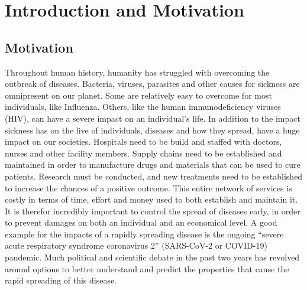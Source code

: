 
\chapter{Introduction and Motivation} %

\label{chap:introduction} %

\section{Motivation}
Throughout human history, humanity has struggled with overcoming the outbreak of diseases.
Bacteria, viruses, parasites and other causes for sickness are omnipresent on our planet\cite{balloux2017q}. Some are
relatively easy to overcome for most individuals, like Influenza\cite{cdc_influenza}. Others, like the human immunodeficiency viruses (HIV),
can have a severe impact on an individual's life\cite{chaponda2018systematic,ji2007impact}. In addition to the impact sickness has
on the live of individuals, diseases and how they spread, have a huge impact on our societies. Hospitals need to be 
build and staffed with doctors, nurses and other facility members. Supply chains need to be established and maintained in order
to manufacture drugs and materials that can be used to cure patients. Research must be conducted, and new treatments need to be
established to increase the chances of a positive outcome. This entire network of services is costly in terms of time, effort
and money used to both establish and maintain it. It is therefor incredibly important to control the spread of diseases early,
in order to prevent damages on both an individual and an economical level.
A good example for the impacts of a rapidly spreading disease is the ongoing ``severe acute respiratory syndrome coronavirus 2''
(SARS-CoV-2 or COVID-19) pandemic. Much political and scientific debate in the past two years has revolved around options to better
understand and predict the properties that cause the rapid spreading of this disease. 


